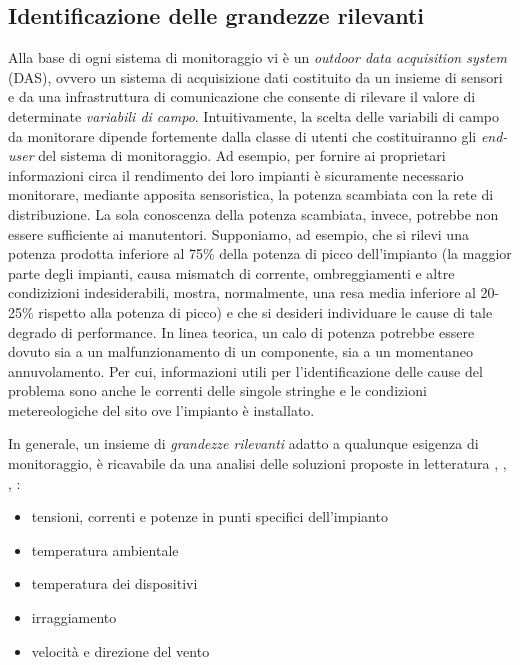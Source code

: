 \subsection{Identificazione delle grandezze rilevanti}
Alla base di ogni sistema di monitoraggio vi \`e un \emph{outdoor data acquisition system} 
(DAS), ovvero un sistema di acquisizione dati costituito da un insieme di sensori 
e da una infrastruttura di comunicazione che consente di rilevare il valore di 
determinate \emph{variabili di campo}. 
Intuitivamente, la scelta delle variabili di campo da monitorare dipende fortemente dalla 
classe di utenti che costituiranno gli \emph{end-user} del sistema di monitoraggio.
%
Ad esempio, per fornire ai proprietari informazioni circa il rendimento dei loro impianti 
\`e sicuramente necessario monitorare, mediante apposita sensoristica, la potenza scambiata 
con la rete di distribuzione. La sola conoscenza della potenza scambiata, invece, potrebbe 
non essere sufficiente ai manutentori.
%
Supponiamo, ad esempio, che si rilevi una potenza prodotta inferiore al 75\% della potenza di picco
dell'impianto (la maggior parte degli impianti, causa mismatch di corrente, ombreggiamenti e 
altre condizizioni indesiderabili, mostra, normalmente, una resa media inferiore al 20-25\% rispetto 
alla potenza di picco\cite{roman06}) e che si desideri individuare le cause di tale degrado 
di performance.
%
In linea teorica, un calo di potenza potrebbe essere dovuto sia a un malfunzionamento 
di un componente, sia a un momentaneo annuvolamento. Per cui, informazioni utili per 
l'identificazione delle cause del problema sono anche le correnti delle singole stringhe e le 
condizioni metereologiche del sito ove l'impianto \`e installato.

%
In generale, un insieme di \emph{grandezze rilevanti} adatto a qualunque esigenza 
di monitoraggio, \`e ricavabile da una analisi delle soluzioni proposte in letteratura
\cite{xiaoli11}, \cite{dirks06}, \cite{kolodenny06}, \cite{aristizabal06}:
%
\begin{itemize}
\item tensioni, correnti e potenze in punti specifici dell'impianto
\item temperatura ambientale
\item temperatura dei dispositivi
\item irraggiamento
\item velocit\`a e direzione del vento
\end{itemize}
%
